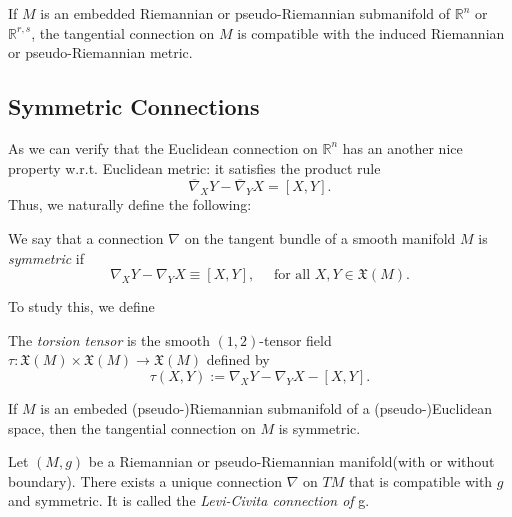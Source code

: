 \begin{proposition}
  \label{proposition-tangential-connection-compatible}
  If \( M \) is an embedded Riemannian or pseudo-Riemannian submanifold of \( \mathbb{R}^n \) or \( \mathbb{R}^{r,s} \), the tangential connection on \( M \) is compatible with the induced Riemannian or pseudo-Riemannian metric.
\end{proposition}

\subsection{Symmetric Connections}
\label{symmetric-connections}

As we can verify that the Euclidean connection on \( \mathbb{R}^n \) has an another nice property w.r.t. Euclidean metric: it satisfies the product rule
\[
  \overline{\nabla}_X Y - \overline{\nabla}_Y X = [X, Y].
\]
Thus, we naturally define the following:

\begin{definition}
  \label{definition-connection-symmetric}
  We say that a connection \( \nabla \) on the tangent bundle of a smooth manifold \( M \) is \emph{symmetric} if
  \[
    \nabla_X Y - \nabla_Y X \equiv [X, Y],\quad \text{ for all } X, Y \in \mathfrak{X}(M).
  \]
\end{definition}
\noindent To study this, we define
\begin{definition}
  \label{definition-torsion-tensor}
  The \emph{torsion tensor} is the smooth \( (1, 2) \)-tensor field \( \tau: \mathfrak{X}(M) \times \mathfrak{X}(M) \to \mathfrak{X}(M) \) defined by
  \[
    \tau(X, Y) := \nabla_X Y - \nabla_Y X - [X, Y].
  \]
\end{definition}

\begin{proposition}
  \label{proposition-tangential-connection-symmetric}
  If \( M \) is an embeded (pseudo-)Riemannian submanifold of a (pseudo-)Euclidean space, then the tangential connection on \( M \) is symmetric.
\end{proposition}

\begin{theorem}
  \label{theorem-fundamental-theorem-of-Riemannian-geometry}
  Let \( (M, g) \) be a Riemannian or pseudo-Riemannian manifold(with or without boundary).
  There exists a unique connection \( \nabla \) on \( TM \) that is compatible with \( g \) and symmetric.
  It is called the \emph{Levi-Civita connection of} g.
\end{theorem}

